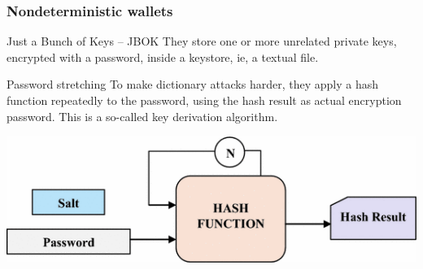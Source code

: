 \documentclass[11pt]{beamer}  %
\begin{document}
\begin{frame}\frametitle{Nondeterministic wallets}

  \begin{greenbox}{Just a Bunch of Keys -- JBOK}
    They store one or more unrelated private keys, encrypted with a password,
    inside a keystore, ie, a textual file.
  \end{greenbox}

  \medskip

  \begin{greenbox}{Password stretching}
    To make dictionary attacks harder, they apply a hash function
    repeatedly to the password, using the hash result as actual encryption
    password. This is a so-called \alert{key derivation algorithm}.
  \begin{center}
    \includegraphics[width=\textwidth,clip=false]{pictures/key-derivation-function.png}
  \end{center}
  \end{greenbox}

\end{frame}
\end{document}
